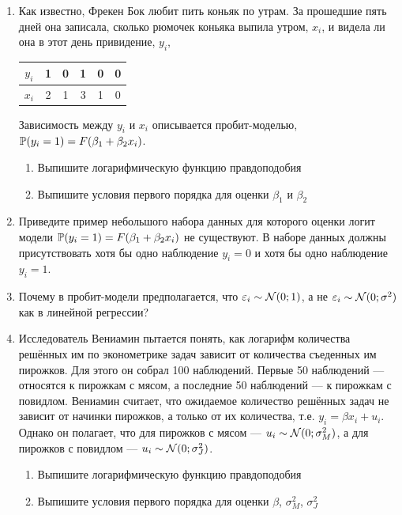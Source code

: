 \documentclass[12pt, a4paper]{article}
\begin{document}
\begin{enumerate}
\thispagestyle{empty}

\item Как известно, Фрекен Бок любит пить коньяк по утрам. За прошедшие пять дней она записала, сколько рюмочек коньяка выпила утром, $x_i$, и видела ли она в этот день привидение, $y_i$,

\begin{tabular}{c|ccccc}
$y_i$ & 1 & 0 & 1 & 0 & 0 \\
\hline
$x_i$ & 2 & 1 & 3 & 1 & 0
\end{tabular}

Зависимость между $y_i$ и $x_i$ описывается пробит-моделью, $\P(y_i=1)=F(\beta_1 + \beta_2 x_i)$.

\begin{enumerate}
\item Выпишите логарифмическую функцию правдоподобия
\item Выпишите условия первого порядка для оценки $\beta_1$ и $\beta_2$
\end{enumerate}


\item Приведите пример небольшого набора данных для которого оценки логит модели $\P(y_i=1)=F(\beta_1 + \beta_2 x_i)$ не существуют. В наборе данных должны присутствовать хотя бы одно наблюдение $y_i=0$ и хотя бы одно наблюдение $y_i=1$.

\item Почему в пробит-модели предполагается, что $\e_i \sim \cN(0;1)$, а не $\e_i \sim \cN(0;\sigma^2)$ как в линейной регрессии?

\item Исследователь Вениамин пытается понять, как логарифм количества решённых им по эконометрике задач зависит от количества съеденных им пирожков. Для этого он собрал 100 наблюдений. Первые 50 наблюдений — относятся к пирожкам с мясом, а последние 50 наблюдений — к пирожкам с повидлом. Вениамин считает, что ожидаемое количество решённых задач не зависит от начинки пирожков, а только от их количества, т.е. $y_i = \beta x_i + u_i$. Однако он полагает, что для пирожков с мясом — $u_i\sim \cN(0;\sigma^2_M)$, а для пирожков с повидлом — $u_i\sim \cN(0;\sigma^2_J)$.

\begin{enumerate}
\item Выпишите логарифмическую функцию правдоподобия
\item Выпишите условия первого порядка для оценки $\beta$, $\sigma^2_M$, $\sigma^2_J$
\end{enumerate}


\end{enumerate}
\end{document}
